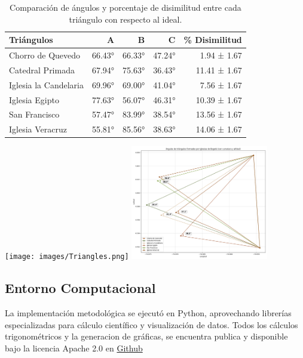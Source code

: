 \documentclass[a4paper,alpha-refs]{eSpectra}
\begin{document}
\begin{table}[h!]
\centering
\begin{tabular}{|l|r|r|r|r|}
\hline
\textbf{Triángulos} & \textbf{A} & \textbf{B} & \textbf{C} & \textbf{\% Disimilitud} \\
\hline

Chorro de Quevedo     & 66.43° & 66.33° & 47.24° & 1.94 ± 1.67 \\
Catedral Primada      & 67.94° & 75.63° & 36.43° & 11.41 ± 1.67 \\
Iglesia la Candelaria & 69.96° & 69.00° & 41.04° & 7.56 ± 1.67 \\
Iglesia Egipto        & 77.63° & 56.07° & 46.31° & 10.39 ± 1.67 \\
San Francisco         & 57.47° & 83.99° & 38.54° & 13.56 ± 1.67 \\
Iglesia Veracruz      & 55.81° & 85.56° & 38.63° & 14.06 ± 1.67 \\
\hline
\end{tabular}
\caption{Comparación de ángulos y porcentaje de disimilitud entre cada triángulo con respecto al ideal.}
\label{Cuadro 2}
\end{table}
\vspace{-\baselineskip}  %
\vspace{-\baselineskip}  %
\centering
\texttt{[image: images/Triangles.png]}
    \label{Figura 4}
   \includegraphics[width=0.45\textwidth]{images/triangles_with_arcs.png}
    \label{Figura 5}

\justifying
\subsection{Entorno Computacional}
La implementación metodológica se ejecutó en Python, aprovechando librerías especializadas para cálculo científico y visualización de datos. Todos los cálculos trigonométricos y la generacion de gráficas, se encuentra publica y disponible bajo la licencia Apache 2.0 en \href{https://github.com/Usuy-Leon/El-secreto-astronomico-de-Guadalupe-Monserrate}{Github}
\end{document}
